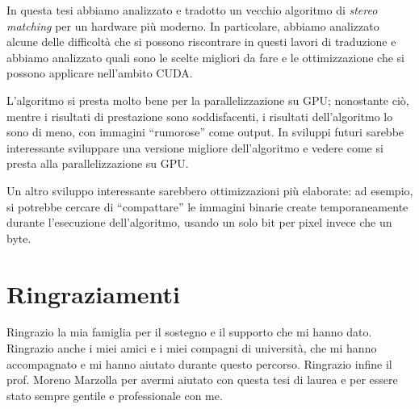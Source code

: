 \documentclass[12pt,a4paper,openright,twoside]{report}
\begin{document}
In questa tesi abbiamo analizzato e tradotto un vecchio algoritmo di \textit{stereo matching} per un hardware più moderno. In particolare, abbiamo analizzato alcune delle difficoltà che si possono riscontrare in questi lavori di traduzione e abbiamo analizzato quali sono le scelte migliori da fare e le ottimizzazione che si possono applicare nell'ambito CUDA.

L'algoritmo si presta molto bene per la parallelizzazione su GPU; nonostante ciò, mentre i risultati di prestazione sono soddisfacenti, i risultati dell'algoritmo lo sono di meno, con immagini ``rumorose'' come output. In sviluppi futuri sarebbe interessante sviluppare una versione migliore dell'algoritmo e vedere come si presta alla parallelizzazione su GPU.

Un altro sviluppo interessante sarebbero ottimizzazioni più elaborate: ad esempio, si potrebbe cercare di ``compattare'' le immagini binarie create temporaneamente durante l'esecuzione dell'algoritmo, usando un solo bit per pixel invece che un byte.

\clearpage{\pagestyle{empty}\cleardoublepage}






{}


\rhead[\fancyplain{}{\bfseries \leftmark}]{\fancyplain{}{\bfseries\thepage}}
\clearpage{\pagestyle{empty}\cleardoublepage}



\chapter*{Ringraziamenti}
\thispagestyle{empty}

Ringrazio la mia famiglia per il sostegno e il supporto che mi hanno dato. Ringrazio anche i miei amici e i miei compagni di università, che mi hanno accompagnato e mi hanno aiutato durante questo percorso. Ringrazio infine il prof. Moreno Marzolla per avermi aiutato con questa tesi di laurea e per essere stato sempre gentile e professionale con me.

\nocite{*}
\end{document}

